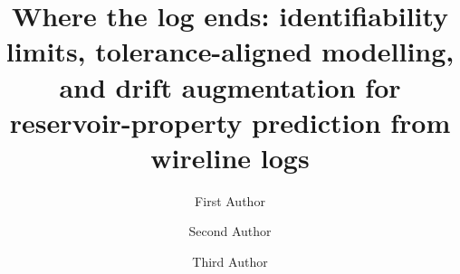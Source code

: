 \documentclass[preprint,12pt]{elsarticle}
\begin{document}
\begin{frontmatter}

\title{Where the log ends: identifiability limits, tolerance-aligned modelling, and drift augmentation for reservoir-property prediction from wireline logs}

\author[a]{First Author}
\author[a]{Second Author}
\author[b]{Third Author}


\end{frontmatter}
\end{document}
